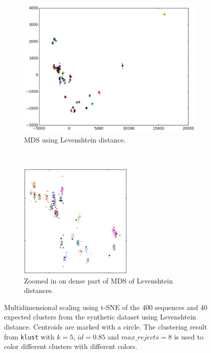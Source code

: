 \begin{figure}[H]
  \begin{subfigure}[t]{\textwidth}
    \includegraphics[width=\textwidth]{graphics/MDS_t-SNE_distmat_synth_SILVA_3800_levenshtein_400.png}
    \caption{MDS using Levenshtein distance.}
    \label{fig:mds_synth_lev}
  \end{subfigure}
  ~
  \begin{subfigure}[b]{1.0\textwidth}
    \centering
    \includegraphics[width=0.6\textwidth]{graphics/MDS_t-SNE_distmat_synth_SILVA_3800_levenshtein_400_sub.png}
    \caption{Zoomed in on dense part of MDS of Levenshtein distances.}
    \label{fig:mds_synth_lev_zoom}
  \end{subfigure}
  \caption{Multidimensional scaling using t-SNE of the 400 sequences and 40
    expected clusters from the synthetic dataset using Levenshtein distance.
    Centroids are marked with a circle. The clustering result from
    \texttt{klust} with $k=5$, $id=0.85$ and $max\_rejects=8$ is used to color
    different clusters with different colors.}
\end{figure}


